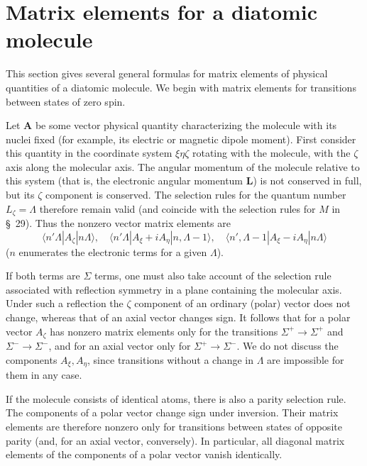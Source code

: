\section{Matrix elements for a diatomic molecule}

This section gives several general formulas for matrix elements of physical quantities of a diatomic molecule. We begin with matrix elements for transitions between states of zero spin.

Let $\mathbf A$ be some vector physical quantity characterizing the molecule with its nuclei fixed (for example, its electric or magnetic dipole moment). First consider this quantity in the coordinate system $\xi\eta\zeta$ rotating with the molecule, with the $\zeta$ axis along the molecular axis. The angular momentum of the molecule relative to this system (that is, the electronic angular momentum $\mathbf L$) is not conserved in full, but its $\zeta$ component is conserved. The selection rules for the quantum number $L_\zeta=\Lambda$ therefore remain valid (and coincide with the selection rules for $M$ in \S~29). Thus the nonzero vector matrix elements are
\begin{equation}
\langle n'\Lambda|A_\zeta|n\Lambda\rangle,\quad
\langle n'\Lambda|A_\xi+iA_\eta|n,\Lambda-1\rangle,\quad
\langle n',\Lambda-1|A_\xi-iA_\eta|n\Lambda\rangle
\tag{87.1}
\end{equation}
($n$ enumerates the electronic terms for a given $\Lambda$).

If both terms are $\Sigma$ terms, one must also take account of the selection rule associated with reflection symmetry in a plane containing the molecular axis. Under such a reflection the $\zeta$ component of an ordinary (polar) vector does not change, whereas that of an axial vector changes sign. It follows that for a polar vector $A_\zeta$ has nonzero matrix elements only for the transitions $\Sigma^+\to\Sigma^+$ and $\Sigma^-\to\Sigma^-$, and for an axial vector only for $\Sigma^+\to\Sigma^-$. We do not discuss the components $A_\xi,A_\eta$, since transitions without a change in $\Lambda$ are impossible for them in any case.

If the molecule consists of identical atoms, there is also a parity selection rule. The components of a polar vector change sign under inversion. Their matrix elements are therefore nonzero only for transitions between states of opposite parity (and, for an axial vector, conversely). In particular, all diagonal matrix elements of the components of a polar vector vanish identically.

